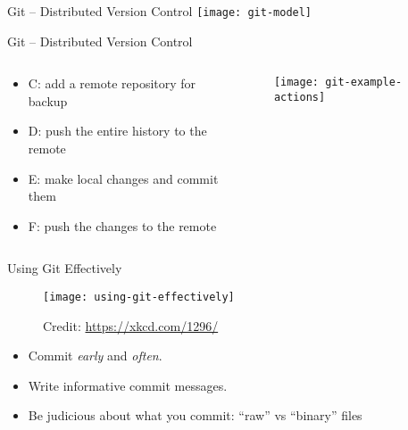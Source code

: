 \documentclass{beamer}
\begin{document}
\begin{frame}{Git -- Distributed Version Control}
  \center
  \texttt{[image: git-model]}
\end{frame}

\begin{frame}{Git -- Distributed Version Control}
  \begin{columns}
    \begin{column}{0.6\textwidth}
      \begin{itemize}
        \item C: add a remote repository for backup
        \item D: push the entire history to the remote
        \item E: make local changes and commit them
        \item F: push the changes to the remote
      \end{itemize}
    \end{column}

    \begin{column}{0.5\textwidth}
      \begin{figure}
        \center
        \texttt{[image: git-example-actions]}
      \end{figure}
    \end{column}
  \end{columns}
\end{frame}

\begin{frame}{Using Git Effectively}
  \begin{figure}
    \center
    \texttt{[image: using-git-effectively]}
    \caption{
      Credit: \url{https://xkcd.com/1296/}
    }
  \end{figure}

  \begin{itemize}
    \item Commit \textit{early} and \textit{often}.

    \item Write informative commit messages.

    \item Be judicious about what you commit: ``raw'' vs ``binary'' files
  \end{itemize}
\end{frame}
\end{document}

